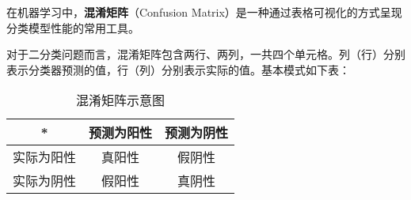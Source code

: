 
在机器学习中，\textbf{混淆矩阵}（Confusion Matrix）是一种通过表格可视化的方式呈现分类模型性能的常用工具。

对于二分类问题而言，混淆矩阵包含两行、两列，一共四个单元格。列（行）分别表示分类器预测的值，行（列）分别表示实际的值。基本模式如下表：
\begin{table}[ht]
\centering
\caption{混淆矩阵示意图}\label{ConMat_tab1}
\begin{tabular}{|c|c|c|}
\hline
* & 预测为阳性 & 预测为阴性 \\
\hline
实际为阳性 & 真阳性 & 假阴性 \\
\hline
实际为阴性 & 假阳性 & 真阴性 \\
\hline
\end{tabular}
\end{table}